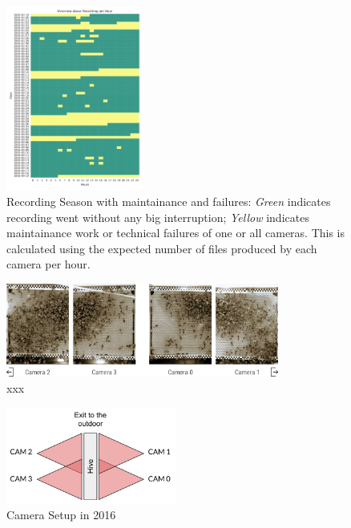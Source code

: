 \begin{figure}[htb]
	\centering
	\includegraphics[width=0.4\textwidth]{Figures/recording}
	\caption[Recording Season]{Recording Season with maintainance and failures: \emph{Green} indicates recording went without any big interruption; \emph{Yellow} indicates maintainance work or technical failures of one or all cameras. This is calculated using the expected number of files produced by each camera per hour.}
	\label{fig:period}
\end{figure}

\begin{figure}[htb]
	\centering
	\includegraphics[width=0.8\textwidth]{Figures/beesClose}
	\caption[xxx]{xxx}
	\label{fig:veryclose}
\end{figure}


\begin{figure}[htb]
	\centering
	\includegraphics[width=0.5\textwidth]{Figures/setupCams}
	\caption[Camera Setup in 2016]{Camera Setup in 2016}
	\label{fig:cams}
\end{figure}

